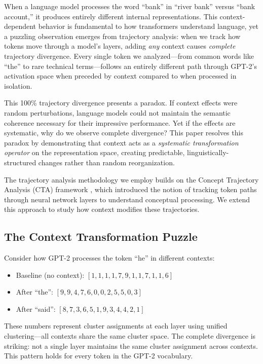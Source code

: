 \documentclass[11pt]{article}
\begin{document}
When a language model processes the word ``bank'' in ``river bank'' versus ``bank account,'' it produces entirely different internal representations. This context-dependent behavior is fundamental to how transformers understand language, yet a puzzling observation emerges from trajectory analysis: when we track how tokens move through a model's layers, adding \emph{any} context causes \emph{complete} trajectory divergence. Every single token we analyzed---from common words like ``the'' to rare technical terms---follows an entirely different path through GPT-2's activation space when preceded by context compared to when processed in isolation.

This 100\% trajectory divergence presents a paradox. If context effects were random perturbations, language models could not maintain the semantic coherence necessary for their impressive performance. Yet if the effects are systematic, why do we observe complete divergence? This paper resolves this paradox by demonstrating that context acts as a \emph{systematic transformation operator} on the representation space, creating predictable, linguistically-structured changes rather than random reorganization.

The trajectory analysis methodology we employ builds on the Concept Trajectory Analysis (CTA) framework \cite{smigaj2024cta}, which introduced the notion of tracking token paths through neural network layers to understand conceptual processing. We extend this approach to study how context modifies these trajectories.

\subsection{The Context Transformation Puzzle}

Consider how GPT-2 processes the token ``he'' in different contexts:
\begin{itemize}
    \item Baseline (no context): $[1, 1, 1, 1, 7, 9, 1, 1, 7, 1, 1, 6]$
    \item After ``the'': $[9, 9, 4, 7, 6, 0, 0, 2, 5, 5, 0, 3]$
    \item After ``said'': $[8, 7, 3, 6, 5, 1, 9, 3, 4, 4, 2, 1]$
\end{itemize}

These numbers represent cluster assignments at each layer using unified clustering---all contexts share the same cluster space. The complete divergence is striking: not a single layer maintains the same cluster assignment across contexts. This pattern holds for every token in the GPT-2 vocabulary.
\end{document}
